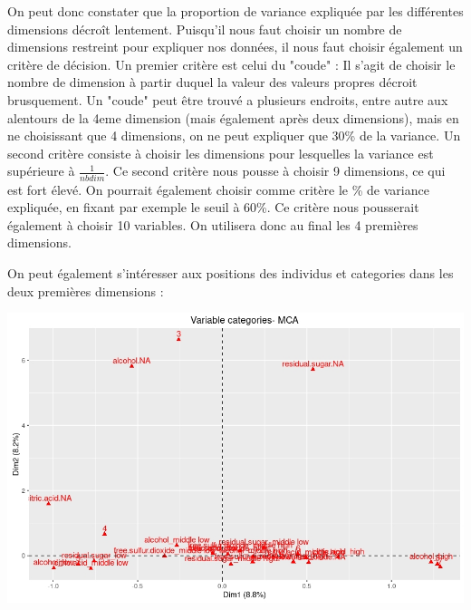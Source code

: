 \documentclass[11pt,a4paper]{article}
\begin{document}
On peut donc constater que la proportion de variance expliquée par les différentes dimensions décroît lentement. Puisqu'il nous faut choisir un nombre de dimensions restreint pour expliquer nos données, il nous faut choisir également un critère de décision. Un premier critère est celui du "coude" : Il s'agit de choisir le nombre de dimension à partir duquel la valeur des valeurs propres décroit brusquement. Un "coude" peut être trouvé a plusieurs endroits, entre autre aux alentours de la 4eme dimension (mais également après deux dimensions), mais en ne choisissant que 4 dimensions, on ne peut expliquer que 30\% de la variance. Un second critère consiste à choisir les dimensions pour lesquelles la variance est supérieure à $\frac{1}{nbdim}$. Ce second critère nous pousse à choisir 9 dimensions, ce qui est fort élevé. On pourrait également choisir comme critère le \% de variance expliquée, en fixant par exemple le seuil à 60\%. Ce critère nous pousserait également à choisir 10 variables. On utilisera  donc au final les 4 premières dimensions.\bigskip

On peut également s'intéresser aux positions des individus et categories dans les deux premières dimensions :

\begin{center}
\includegraphics[scale=0.6]{"biplot-mca"}
\end{center}
\end{document}
